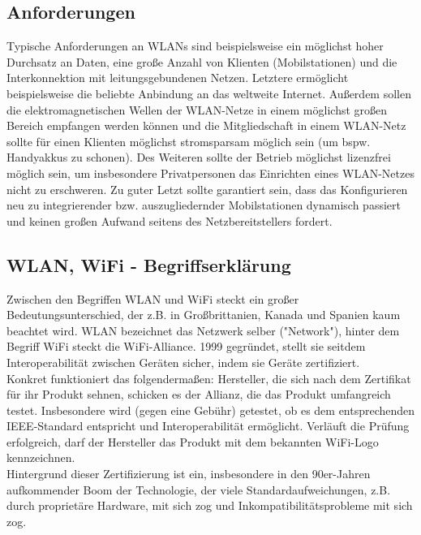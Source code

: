 \documentclass[a4paper,13pt]{scrartcl}
\begin{document}
\subsection{Anforderungen}
Typische Anforderungen an WLANs sind beispielsweise ein möglichst hoher Durchsatz an Daten, eine große Anzahl von Klienten (Mobilstationen) und die Interkonnektion mit leitungsgebundenen Netzen. Letztere ermöglicht beispielsweise die beliebte Anbindung an das weltweite Internet. Außerdem sollen die elektromagnetischen Wellen der WLAN-Netze in einem möglichst großen Bereich empfangen werden können und die Mitgliedschaft in einem WLAN-Netz sollte für einen Klienten möglichst stromsparsam möglich sein (um bspw. Handyakkus zu schonen). Des Weiteren sollte der Betrieb möglichst lizenzfrei möglich sein, um insbesondere Privatpersonen das Einrichten eines WLAN-Netzes nicht zu erschweren. Zu guter Letzt sollte garantiert sein, dass das Konfigurieren neu zu integrierender bzw. auszugliedernder Mobilstationen dynamisch passiert und keinen großen Aufwand seitens des Netzbereitstellers fordert.
\subsection{WLAN, WiFi - Begriffserklärung}
Zwischen den Begriffen WLAN und WiFi steckt ein großer Bedeutungsunterschied, der z.B. in Großbrittanien, Kanada und Spanien kaum beachtet wird. WLAN bezeichnet das Netzwerk selber ("Network"), hinter dem Begriff WiFi steckt die WiFi-Alliance. 1999 gegründet, stellt sie seitdem Interoperabilität zwischen Geräten sicher, indem sie Geräte zertifiziert.\\ Konkret funktioniert das folgendermaßen: Hersteller, die sich nach dem Zertifikat für ihr Produkt sehnen, schicken es der Allianz, die das Produkt umfangreich testet. Insbesondere wird (gegen eine Gebühr) getestet, ob es dem entsprechenden IEEE-Standard entspricht und Interoperabilität ermöglicht. Verläuft die Prüfung erfolgreich, darf der Hersteller das Produkt mit dem bekannten WiFi-Logo kennzeichnen.\\
Hintergrund dieser Zertifizierung ist ein, insbesondere in den 90er-Jahren aufkommender Boom der Technologie, der viele Standardaufweichungen, z.B. durch proprietäre Hardware, mit sich zog und Inkompatibilitätsprobleme mit sich zog.
\end{document}
